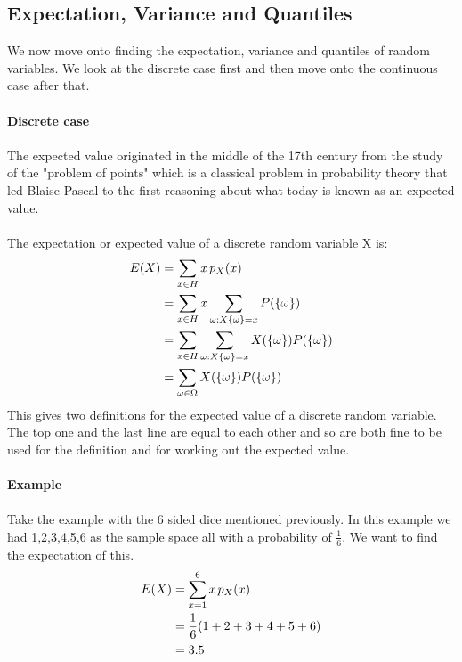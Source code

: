 \documentclass[,oneside]{article}
\begin{document}
\begin{enumerate}
\subsection{Expectation, Variance and Quantiles}
We now move onto finding the expectation, variance and quantiles of random variables. We look at the discrete case first and then move onto the continuous case after that.\\ \\
\textbf{Discrete case}\\ \\
The expected value originated in the middle of the 17th century from the study of the "problem of points" which is a classical problem in probability theory that led Blaise Pascal to the first reasoning about what today is known as an expected value.\\ \\
The expectation or expected value of a discrete random variable X is: \\ 
\begin{align*}
E(X) &= \sum\limits_{x \in H} x\hspace{0.05cm}p_X(x)\\
&= \sum\limits_{x \in H} x \sum\limits_{\omega : X\{\omega\}=x} P(\{\omega\})\\
&= \sum\limits_{x \in H} \sum\limits_{\omega : X\{\omega\}=x} X(\{\omega\}) P(\{\omega\})\\
&= \sum\limits_{\omega \in \Omega} X(\{\omega\}) P(\{\omega\})\\
\end{align*}
This gives two definitions for the expected value of a discrete random variable. The top one and the last line are equal to each other and so are both fine to be used for the definition and for working out the expected value.\\ \\
\textbf{Example}\\ \\
Take the example with the 6 sided dice mentioned previously. In this example we had 1,2,3,4,5,6 as the sample space all with a probability of $\frac{1}{6}$. We want to find the expectation of this. \\
\begin{align*}
E(X) &= \sum\limits_{x = 1}^{6} x\hspace{0.05cm}p_X(x)\\
&= \frac{1}{6}(1+2+3+4+5+6)\\
&= 3.5
\end{align*}\\

\end{enumerate}
\end{document}
